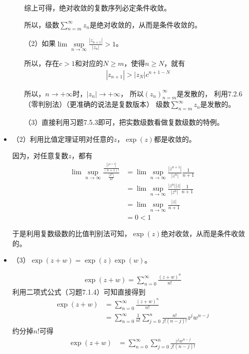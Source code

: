 \documentclass{article}
\begin{document}
\begin{itemize}
\begin{itemize}
                综上可得，绝对收敛的复数序列必定条件收敛。

                所以，级数$\sum\limits_{n = m}^\infty z_n$是绝对收敛的，从而是条件收敛的。


                （2）如果$\lim\sup\limits_{n \to \infty} \frac{|z_{n + 1}|}{|z_n|} > 1$。

                所以，存在$c > 1$和对应的$N \geq m$，使得$n \geq N$，就有
                \begin{align*}
                  |z_{n + 1}| > |z_N|c^{n + 1 - N}
                \end{align*}

                所以，$n \to +\infty$时，$|z_n| \to +\infty$，
                所以$(z_n)_{n = m}^\infty$是发散的，
                利用7.2.6（零判别法）（更准确的说法是复数版本）
                级数$\sum\limits_{n = m}^\infty z_n$是发散的。

                （3）直接利用习题7.5.3即可，把实数级数看做复数级数的特例。
        \end{itemize}

  \item （2）利用比值定理证明对任意的$z$，$\exp(z)$都是收敛的。

        因为，对任意复数$z$，都有
        \begin{align*}
          \lim\sup\limits_{n \to \infty}\frac{\frac{|z^{n+1}|}{(n+1)!}}{\frac{|z^{n}|}{n!}}
           & = \lim\sup\limits_{n \to \infty}\frac{|z^{n+1}|}{|z^{n}|} \frac{1}{n+1} \\
           & = \lim\sup\limits_{n \to \infty}\frac{|z^{n}||z|}{|z^{n}|}\frac{1}{n+1} \\
           & = \lim\sup\limits_{n \to \infty}\frac{|z|}{n + 1}                       \\
           & = 0 < 1
        \end{align*}

        于是利用复数级数的比值判别法可知，$\exp(z)$绝对收敛，从而是条件收敛的。

  \item （3）$\exp(z + w) = \exp(z) \exp(w)$。

        \begin{align*}
          \exp(z + w) = \sum\limits_{n = 0}^\infty \frac{(z + w)^n}{n!}
        \end{align*}
        利用二项式公式（习题7.1.4）可知直接得到
        \begin{align*}
          \exp(z + w)
           & =\sum\limits_{n = 0}^\infty \frac{(z + w)^n}{n!}                                                  \\
           & = \sum\limits_{n = 0}^\infty \frac{1}{n!}\sum \limits_{j = 0}^n \frac{n!}{j!(n - j)!}z^jw^{n - j}
        \end{align*}
        约分掉$n!$可得
        \begin{align*}
          \exp(z + w)
           & = \sum\limits_{n = 0}^\infty \sum \limits_{j = 0}^n \frac{z^jw^{n - j}}{j!(n - j)!}
        \end{align*}


\end{itemize}
\end{document}
